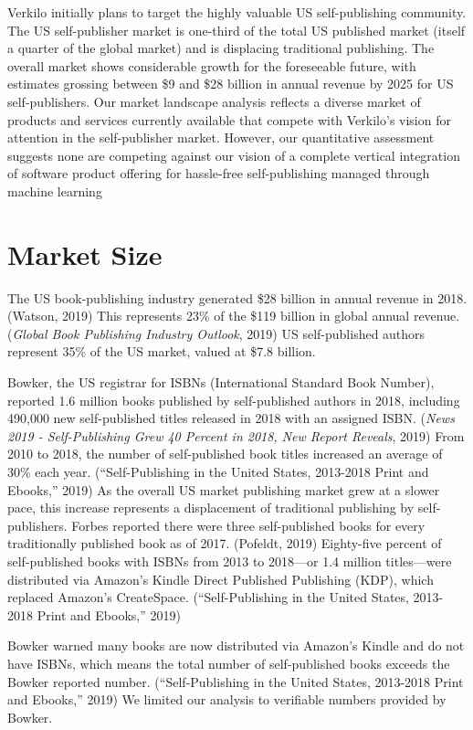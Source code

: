 \documentclass[10pt,openany]{book}
\begin{document}
Verkilo initially plans to target the highly valuable US self-publishing
community. The US self-publisher market is one-third of the total US
published market (itself a quarter of the global market) and is
displacing traditional publishing. The overall market shows considerable
growth for the foreseeable future, with estimates grossing between \$9
and \$28 billion in annual revenue by 2025 for US self-publishers. Our
market landscape analysis reflects a diverse market of products and
services currently available that compete with Verkilo's vision for
attention in the self-publisher market. However, our quantitative
assessment suggests none are competing against our vision of a complete
vertical integration of software product offering for hassle-free
self-publishing managed through machine learning

\hypertarget{market-size}{%
\section{Market Size}\label{market-size}}

The US book-publishing industry generated \$28 billion in annual revenue
in 2018. (Watson, 2019) This represents 23\% of the \$119 billion in
global annual revenue. (\emph{Global Book Publishing Industry Outlook},
2019) US self-published authors represent 35\% of the US market, valued
at \$7.8 billion.

Bowker, the US registrar for ISBNs (International Standard Book Number),
reported 1.6 million books published by self-published authors in 2018,
including 490,000 new self-published titles released in 2018 with an
assigned ISBN. (\emph{News 2019 - Self-Publishing Grew 40 Percent in
2018, New Report Reveals}, 2019) From 2010 to 2018, the number of
self-published book titles increased an average of 30\% each year.
(``Self-Publishing in the United States, 2013-2018 Print and Ebooks,''
2019) As the overall US market publishing market grew at a slower pace,
this increase represents a displacement of traditional publishing by
self-publishers. Forbes reported there were three self-published books
for every traditionally published book as of 2017. (Pofeldt, 2019)
Eighty-five percent of self-published books with ISBNs from 2013 to
2018---or 1.4 million titles---were distributed via Amazon's Kindle
Direct Published Publishing (KDP), which replaced Amazon's CreateSpace.
(``Self-Publishing in the United States, 2013-2018 Print and Ebooks,''
2019)

Bowker warned many books are now distributed via Amazon's Kindle and do
not have ISBNs, which means the total number of self-published books
exceeds the Bowker reported number. (``Self-Publishing in the United
States, 2013-2018 Print and Ebooks,'' 2019) We limited our analysis to
verifiable numbers provided by Bowker.
\end{document}
